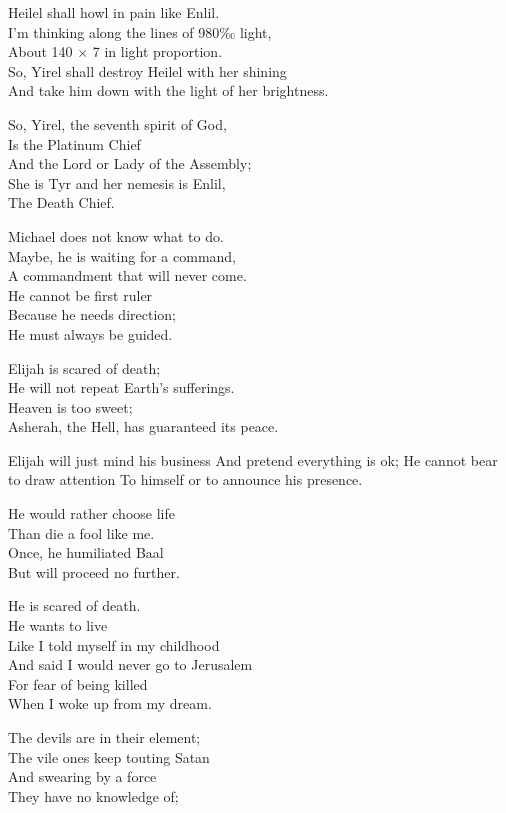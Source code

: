 \documentclass[
]{book}
\begin{document}
Heilel shall howl in pain like Enlil.\\
I'm thinking along the lines of 980‰ light,\\
About 140 × 7 in light proportion.\\
So, Yirel shall destroy Heilel with her shining\\
And take him down with the light of her brightness.

So, Yirel, the seventh spirit of God,\\
Is the Platinum Chief\\
And the Lord or Lady of the Assembly;\\
She is Tyr and her nemesis is Enlil,\\
The Death Chief.

Michael does not know what to do.\\
Maybe, he is waiting for a command,\\
A commandment that will never come.\\
He cannot be first ruler\\
Because he needs direction;\\
He must always be guided.

Elijah is scared of death;\\
He will not repeat Earth's sufferings.\\
Heaven is too sweet;\\
Asherah, the Hell, has guaranteed its peace.

Elijah will just mind his business
And pretend everything is ok;
He cannot bear to draw attention
To himself or to announce his presence.

He would rather choose life\\
Than die a fool like me.\\
Once, he humiliated Baal\\
But will proceed no further.

He is scared of death.\\
He wants to live\\
Like I told myself in my childhood\\
And said I would never go to Jerusalem\\
For fear of being killed\\
When I woke up from my dream.

The devils are in their element;\\
The vile ones keep touting Satan\\
And swearing by a force\\
They have no knowledge of;
\end{document}
